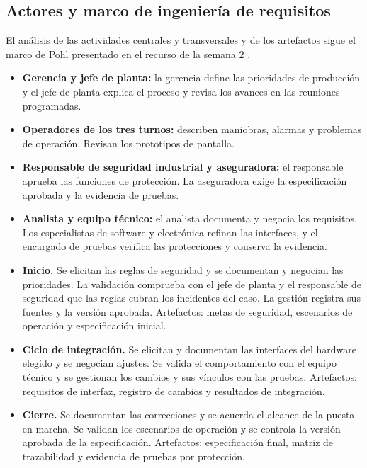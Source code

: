 \documentclass[11pt,a4paper]{article}
\begin{document}
\subsection{Actores y marco de ingeniería de requisitos}

El análisis de las actividades centrales y transversales y de los artefactos sigue el marco de Pohl presentado en el recurso de la semana 2 \cite[sec.~2.1.4]{recursoS2}.

\begin{itemize}
    \item \textbf{Gerencia y jefe de planta:} la gerencia define las prioridades de producción y el jefe de planta explica el proceso y revisa los avances en las reuniones programadas.
    \item \textbf{Operadores de los tres turnos:} describen maniobras, alarmas y problemas de operación. Revisan los prototipos de pantalla.
    \item \textbf{Responsable de seguridad industrial y aseguradora:} el responsable aprueba las funciones de protección. La aseguradora exige la especificación aprobada y la evidencia de pruebas.
    \item \textbf{Analista y equipo técnico:} el analista documenta y negocia los requisitos. Los especialistas de software y electrónica refinan las interfaces, y el encargado de pruebas verifica las protecciones y conserva la evidencia.
\end{itemize}

\begin{itemize}
    \item \textbf{Inicio.} Se elicitan las reglas de seguridad y se documentan y negocian las prioridades. La validación comprueba con el jefe de planta y el responsable de seguridad que las reglas cubran los incidentes del caso. La gestión registra sus fuentes y la versión aprobada. Artefactos: metas de seguridad, escenarios de operación y especificación inicial.
    \item \textbf{Ciclo de integración.} Se elicitan y documentan las interfaces del hardware elegido y se negocian ajustes. Se valida el comportamiento con el equipo técnico y se gestionan los cambios y sus vínculos con las pruebas. Artefactos: requisitos de interfaz, registro de cambios y resultados de integración.
    \item \textbf{Cierre.} Se documentan las correcciones y se acuerda el alcance de la puesta en marcha. Se validan los escenarios de operación y se controla la versión aprobada de la especificación. Artefactos: especificación final, matriz de trazabilidad y evidencia de pruebas por protección.
\end{itemize}
\end{document}
